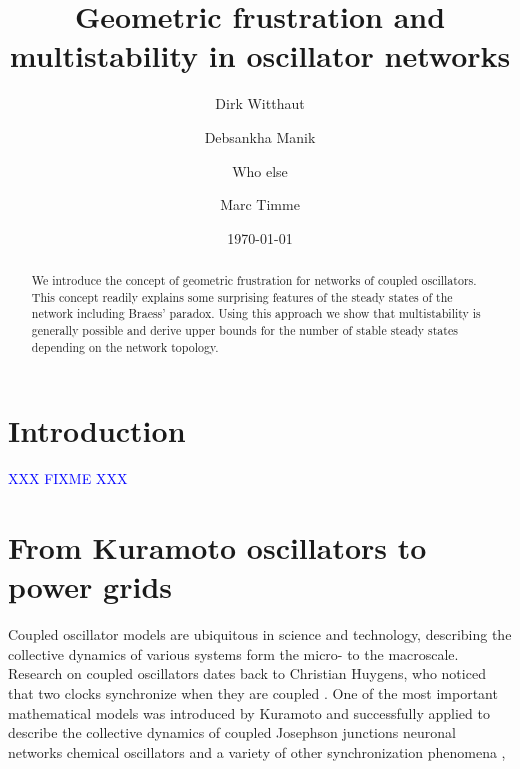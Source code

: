 \documentclass[10pt,aps,pre,preprint,superscriptaddress]{revtex4-1}
\newcommand{\dirk}[1]{\textcolor{blue}{#1}}
\begin{document}

\title{Geometric frustration and multistability in oscillator networks}

\author{Dirk Witthaut}

\author{Debsankha Manik}

\author{Who else}


\author{Marc Timme}



\date{\today }


\begin{abstract}
We introduce the concept of geometric frustration for networks
of coupled oscillators. This concept readily explains some 
surprising features of the steady states of the network 
including Braess' paradox.
Using this approach  
we show that multistability is generally possible and derive
upper bounds for the number of stable steady states depending
on the network topology.
\end{abstract}


\maketitle


\section{Introduction}

\dirk{XXX FIXME XXX}


\section{From Kuramoto oscillators to power grids}

Coupled oscillator models are ubiquitous in science and technology,
describing the collective dynamics of various systems form
the micro- to the macroscale. Research on coupled
oscillators dates back to Christian Huygens, who noticed that
two clocks synchronize when they are coupled \cite{Huyg93}.
One of the most important mathematical models was introduced
by Kuramoto \cite{Kura75,Kura84} and successfully applied
to describe the collective dynamics 
of coupled Josephson junctions \cite{Wies96}
neuronal networks \cite{Vare01}
chemical oscillators \cite{Kiss02}
and a variety of other synchronization phenomena
\cite{Stro00,Aceb05,Aren08},
\end{document}
